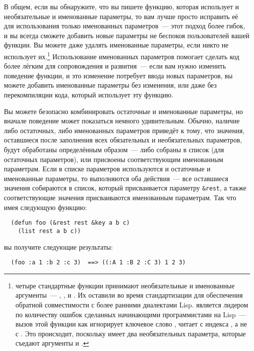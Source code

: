В общем, если вы обнаружите, что вы пишете функцию, которая использует и необязательные и
именованные параметры, то вам лучше просто исправить её для использования только
именованных параметров~--- этот подход более гибок, и вы всегда сможете добавить новые
параметры не беспокоя пользователей вашей функции.  Вы можете даже удалять именованные
параметры, если никто не использует их.\footnote{четыре стандартные функции принимают
  необязательные и именованные аргументы~--- ,
  ,  и .  Их оставили во время
  стандартизации для обеспечения обратной совместимости с более ранними диалектами Lisp.
   является лидером по количеству ошибок сделанных начинающими
  программистами на Lisp~--- вызов этой функции как 
  игнорирует ключевое слово , читает с индекса , а не с .
  Это происходит, поскольку  имеет два необязательных параметра,
  которые съедают аргументы  и .}  Использование именованных
параметров помогает сделать код более лёгким для сопровождения и развития~--- если вам
нужно изменить поведение функции, и это изменение потребует ввода новых параметров, вы
можете добавить именованные параметры без изменения, или даже без перекомпиляции кода,
который использует эту функцию.

Вы можете безопасно комбинировать остаточные и именованные параметры, но вначале поведение
может показаться немного удивительным.  Обычно, наличие либо остаточных, либо именованных
параметров приведёт к тому, что значения, оставшиеся после заполнения всех обязательных и
необязательных параметров, будут обработаны определённым образом~--- либо собраны в список
(для остаточных параметров), или присвоены соответствующим именованным параметрам. Если в
списке параметров используются и остаточные и именованные параметры, то выполняются оба
действия~--- все оставшиеся значения собираются в список, который присваивается параметру
\lstinline!&rest!, а также соответствующие значения присваиваются именованным параметрам.
Так что имея следующую функцию:

\begin{lstlisting}
  (defun foo (&rest rest &key a b c) 
    (list rest a b c))
\end{lstlisting}

вы получите следующие результаты:

\begin{verbatim}
  (foo :a 1 :b 2 :c 3)  ==> ((:A 1 :B 2 :C 3) 1 2 3)
\end{verbatim}

